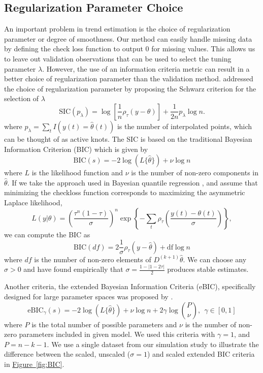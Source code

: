 \documentclass[12pt]{article}
\newcommand{\Fig}[1]{\hyperref[fig:#1]{Figure~\ref*{fig:#1}}} %
\newcommand{\Fig}[1]{{Figure~\ref{fig:#1}}} %
\begin{document}
	\subsection{Regularization Parameter Choice}
	\label{sec:lambda_choice}
	An important problem in trend estimation is the choice of regularization parameter or degree of smoothness. Our method can easily handle missing data by defining the check loss function to output 0 for missing values. This allows us to leave out validation observations that can be used to select the tuning parameter $\lambda$. However, the use of an information criteria metric can result in a better choice of regularization parameter than the validation method.  \cite{KoenkerNgPortnoy1994} addressed the choice of regularization parameter by proposing the Schwarz criterion for the selection of $\lambda$
	\begin{equation}
	\label{eq:SIC}
	\mbox{SIC}(p_{\lambda}) = \log\left[\frac{1}{n}\rho_{\tau}(y - \theta)\right] + \frac{1}{2n}p_{\lambda}\log n.
	\end{equation}
	where $p_{\lambda} = \sum_t I(y(t) = \widehat{\theta}(t))$ is the number of interpolated points, which can be thought of as active knots. The SIC is based on the traditional Bayesian Information Criterion (BIC) which is given by 
	\begin{equation}
	\mbox{BIC}(s) = -2\log(L\{\hat{\theta}\}) + \nu\log n 
	\end{equation}	
	where $L$ is the likelihood function and $\nu$ is the number of non-zero components in $\hat{\theta}$. If we take the approach used in Bayesian quantile regression \citep{yu2001bayesian}, and assume that minimizing the checkloss function corresponds to maximizing the asymmetric Laplace likelihood, \begin{equation}
	L(y|\theta) = \left(\frac{\tau^n(1-\tau)}{\sigma}\right)^n\exp\left\{-\sum_t\rho_\tau\left(\frac{y(t) - \theta(t)}{\sigma}\right)\right\},
	\end{equation} 
	we can compute the BIC as 
	\begin{equation}
	\mbox{BIC}(df) = 2\frac{1}{\sigma}\rho_{\tau}(y-\hat{\theta}) + \mbox{df}\log n
	\end{equation} 
	where $df$ is the number of non-zero elements of $D^{(k+1)}\hat{\theta}$. We can choose any $\sigma>0$ and have found empirically that $\sigma =  \frac{1-|1-2\tau|}{2}$ produces stable estimates. 
	
	Another criteria, the extended Bayesian Information Criteria (eBIC), specifically designed for large parameter spaces was proposed by \cite{chen2008}. 
	\begin{equation}
	\label{eq:eBIC}
	\mbox{eBIC}_{\gamma}(s) = -2\log(L\{\hat{\theta}\}) + \nu\log n  + 2\gamma\log{P \choose \nu},~~\gamma \in [0,1]
	\end{equation}
	where $P$ is the total number of possible parameters and $\nu$ is the number of non-zero parameters included in given model. We used this criteria with $\gamma = 1$, and $P=n-k-1$. We use a single dataset from our simulation study to illustrate the difference between the scaled, unscaled ($\sigma = 1$) and scaled extended BIC criteria in \Fig{BIC}. 
	
\end{document}
